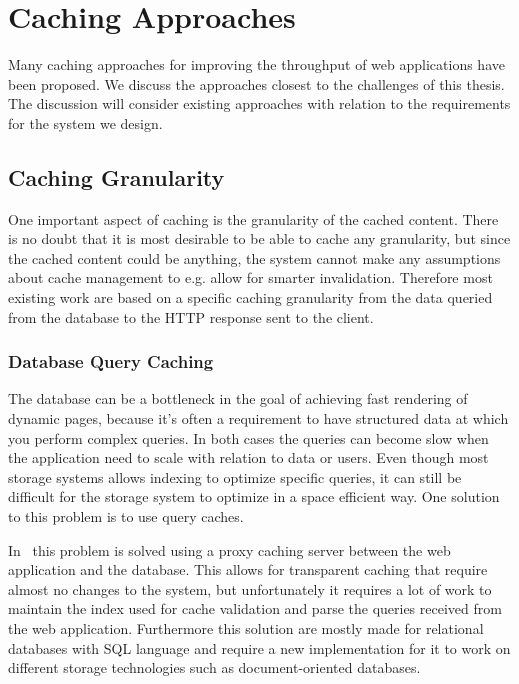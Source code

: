 \chapter{Caching Approaches}
\label{chapter:caching}



Many caching approaches for improving the throughput of web applications have been proposed. We discuss the approaches closest to the challenges of this thesis. The discussion will consider existing approaches with relation to the requirements for the system we design.

\section{Caching Granularity}

One important aspect of caching is the granularity of the cached content. There is no doubt that it is most desirable to be able to cache any granularity, but since the cached content could be anything, the system cannot make any assumptions about cache management to e.g. allow for smarter invalidation. Therefore most existing work are based on a specific caching granularity from the data queried from the database to the HTTP response sent to the client.

\subsection{Database Query Caching}

The database can be a bottleneck in the goal of achieving fast rendering of dynamic pages, because it’s often a requirement to have structured data at which you perform complex queries. In both cases the queries can become slow when the application need to scale with relation to data or users. Even though most storage systems allows indexing to optimize specific queries, it can still be difficult for the storage system to optimize in a space efficient way. One solution to this problem is to use query caches.

In~\cite{paper:transparent-caching, paper:cosar} this problem is solved using a proxy caching server between the web application and the database. This allows for transparent caching that require almost no changes to the system, but unfortunately it requires a lot of work to maintain the index used for cache validation and parse the queries received from the web application. Furthermore this solution are mostly made for relational databases with SQL language and require a new implementation for it to work on different storage technologies such as document-oriented databases.

